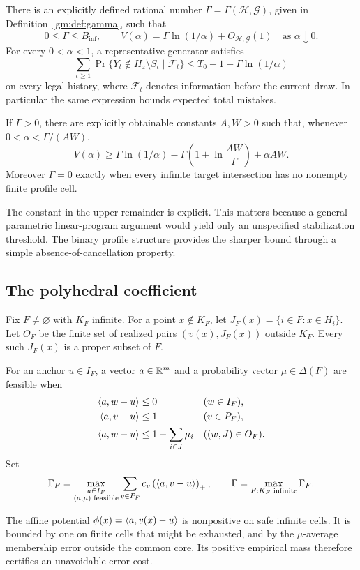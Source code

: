 \begin{theorem}\label{gm:thm:main}
There is an explicitly defined rational number $\Gamma=\Gamma(\mathcal H,\mathcal G)$, given in Definition~\ref{gm:def:gamma}, such that
\[
0\le\Gamma\le B_{\mathrm{inf}},\qquad
V(\alpha)=\Gamma\ln(1/\alpha)+O_{\mathcal H,\mathcal G}(1)
\quad\text{as }\alpha\downarrow0.
\]
For every $0<\alpha<1$, a representative generator satisfies
\begin{equation}\label{gm:eq:upper-main}
\sum_{t\ge1}\Pr\{Y_t\notin H_z\setminus S_t\mid\mathcal F_t\}
\le T_0-1+\Gamma\ln(1/\alpha)
\end{equation}
on every legal history, where $\mathcal F_t$ denotes information before the current draw. In particular the same expression bounds expected total mistakes.

If $\Gamma>0$, there are explicitly obtainable constants $A,W>0$ such that, whenever $0<\alpha<\Gamma/(AW)$,
\begin{equation}\label{gm:eq:lower-main}
V(\alpha)\ge\Gamma\ln(1/\alpha)
-\Gamma\left(1+\ln\frac{AW}{\Gamma}\right)+\alpha AW.
\end{equation}
Moreover $\Gamma=0$ exactly when every infinite target intersection has no nonempty finite profile cell.
\end{theorem}
The constant in the upper remainder is explicit. This matters because a general parametric linear-program argument would yield only an unspecified stabilization threshold. The binary profile structure provides the sharper bound through a simple absence-of-cancellation property.

\subsection{The polyhedral coefficient}\label{gm:sec:coefficient}
Fix $F\ne\varnothing$ with $K_F$ infinite. For a point $x\notin K_F$, let $J_F(x)=\{i\in F:x\in H_i\}$. Let $O_F$ be the finite set of realized pairs $(v(x),J_F(x))$ outside $K_F$. Every such $J_F(x)$ is a proper subset of $F$.

\begin{definition}\label{gm:def:gamma}
For an anchor $u\in I_F$, a vector $a\in\mathbb R^m$ and a probability vector $\mu\in\Delta(F)$ are feasible when
\begin{align}
\langle a,w-u\rangle&\le0 &&(w\in I_F),\label{gm:eq:dual-infinite}\\
\langle a,v-u\rangle&\le1 &&(v\in P_F),\label{gm:eq:dual-finite}\\
\langle a,w-u\rangle&\le1-\sum_{i\in J}\mu_i &&((w,J)\in O_F).\label{gm:eq:dual-outside}
\end{align}
Set
\[
\Gamma_F=\max_{\substack{u\in I_F\\(a,\mu)\text{ feasible}}}
\sum_{v\in P_F}c_v\left(\langle a,v-u\rangle\right)_+,
\qquad
\Gamma=\max_{F:K_F\text{ infinite}}\Gamma_F.
\]
\end{definition}
The affine potential $\phi(x)=\langle a,v(x)-u\rangle$ is nonpositive on safe infinite cells. It is bounded by one on finite cells that might be exhausted, and by the $\mu$-average membership error outside the common core. Its positive empirical mass therefore certifies an unavoidable error cost.

